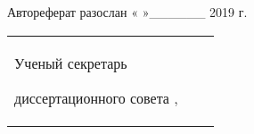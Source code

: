 \vspace{0.004\paperheight}


Автореферат разослан «   »\_\_\_\_\_\_ 2019 г.


\vspace{0.008\paperheight plus1fill}
\noindent%
\begin{tabularx}{\textwidth}{@{}%
>{\raggedright\arraybackslash}b{18em}@{}
>{\centering\arraybackslash}X
r
@{}}
    Ученый секретарь\par
    диссертационного совета
    ,\par
    &
   
    &
\end{tabularx}
